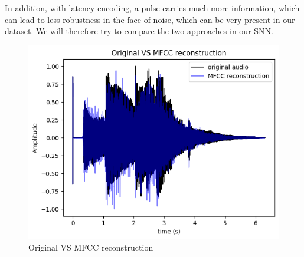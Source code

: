 \documentclass[11pt]{article}
\begin{document}
In addition, with latency encoding, a pulse carries much more information, which can lead to less robustness in the face of noise, which can be very present in our dataset. We will therefore try to compare the two approaches in our SNN.

\begin{figure}[h]
  \centering
  \begin{minipage}{0.45\textwidth}
    \centering
    \includegraphics[width=1\textwidth]{"image/Original VS MFCC reconstruction.png"}
    \caption{Original VS MFCC reconstruction}
    \label{fig:OVSM}
  \end{minipage}\hfill
\end{figure}
\end{document}
